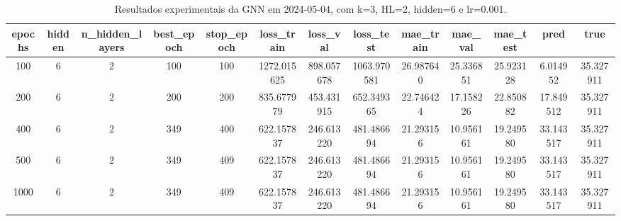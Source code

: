 \begin{table}[h]
\centering
\caption{Resultados experimentais da GNN em 2024-05-04, com k=3, HL=2, hidden=6 e lr=0.001.}
\label{tab:gnn_results_k3_hl2_h6_d20240504}
\begin{tabular}{ccccccccccccc}
\toprule
epochs & hidden & n\_hidden\_layers & best\_epoch & stop\_epoch & loss\_train & loss\_val & loss\_test & mae\_train & mae\_val & mae\_test & pred & true \\
\midrule
100 & 6 & 2 & 100 & 100 & 1272.015625 & 898.057678 & 1063.970581 & 26.987640 & 25.336851 & 25.923128 & 6.014952 & 35.327911 \\
200 & 6 & 2 & 200 & 200 & 835.677979 & 453.431915 & 652.349365 & 22.746424 & 17.158226 & 22.850882 & 17.849512 & 35.327911 \\
400 & 6 & 2 & 349 & 400 & 622.157837 & 246.613220 & 481.486694 & 21.293156 & 10.956161 & 19.249580 & 33.143517 & 35.327911 \\
500 & 6 & 2 & 349 & 409 & 622.157837 & 246.613220 & 481.486694 & 21.293156 & 10.956161 & 19.249580 & 33.143517 & 35.327911 \\
1000 & 6 & 2 & 349 & 409 & 622.157837 & 246.613220 & 481.486694 & 21.293156 & 10.956161 & 19.249580 & 33.143517 & 35.327911 \\
\bottomrule
\end{tabular}
\end{table}
